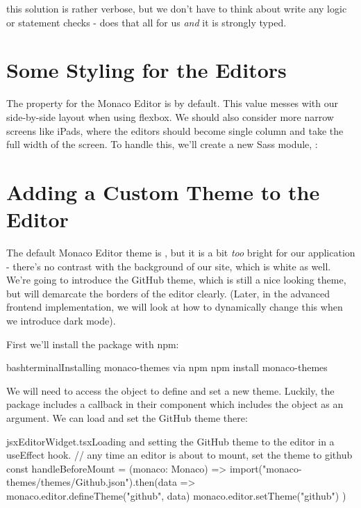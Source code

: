 \documentclass[paper=6in:9in,pagesize=pdftex,headinclude=on,footinclude=on,12pt,twoside]{scrbook}
\makeatletter
\newcommand{\at}{\makeatletter @\makeatother}
\makeatother
\begin{document}
this solution is rather verbose, but we don't have to think about write any  logic or  statement checks -  does that all for us \textit{and} it is strongly typed.

\section{Some Styling for the Editors}

The  property for the Monaco Editor is  by default. This value messes with our side-by-side layout when using flexbox. We should also consider more narrow screens like iPads, where the editors should become single column and take the full width of the screen. To handle this, we'll create a new Sass module, :


\section{Adding a Custom Theme to the Editor}

The default Monaco Editor theme is , but it is a bit \textit{too} bright for our application - there's no contrast with the background of our site, which is white as well. We're going to introduce the GitHub theme, which is still a nice looking theme, but will demarcate the borders of the editor clearly. (Later, in the advanced frontend implementation, we will look at how to dynamically change this when we introduce dark mode).

First we'll install the package  with npm:

\begin{codeInput}{bash}{terminal}{Installing monaco-themes via npm}
npm install monaco-themes
\end{codeInput}

We will need to access the  object to define and set a new theme. Luckily, the \codeword{\at monaco-editor/react} package includes a  callback in their component which includes the  object as an argument. We can load and set the GitHub theme there:

\begin{codeInput}{jsx}{EditorWidget.tsx}{Loading and setting the GitHub theme to the editor in a useEffect hook.}
// any time an editor is about to mount, set the theme to github
const handleBeforeMount = (monaco: Monaco) => {
  import("monaco-themes/themes/Github.json").then(data => {
    monaco.editor.defineTheme("github", data)
    monaco.editor.setTheme("github")
  })
}
\end{codeInput}
\end{document}
